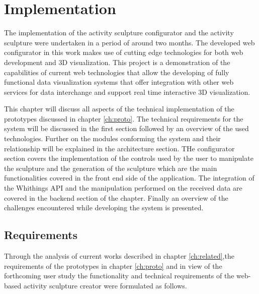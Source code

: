 \documentclass[../medieninformatik-arbeit.tex]{subfiles}
\begin{document}
\section{Implementation}
\label{ch:configurator}
The implementation of the activity sculpture configurator and the activity sculpture were undertaken in a period of around two months. The developed web configurator in this work makes use of cutting edge technologies for both web development and 3D visualization. This project is a demonstration of the capabilities of current web technologies that allow the developing of fully functional data visualization systems that offer integration with other web services for data interchange and support real time interactive 3D visualization.

This chapter will discuss all aspects of the technical implementation of the prototypes discussed in chapter \ref{ch:proto}. The technical requirements for the system will be discussed in the first section followed by an overview of the used technologies. Further on the modules conforming the system and their relationship will be explained in the architecture section. THe configurator section covers the implementation of the controls used by the user to manipulate the sculpture and the generation of the sculpture which are the main functionalities covered in the front end side of the application. The integration of the Whithings API and the manipulation performed on the received data are covered in the backend section of the chapter. Finally an overview of the challenges encountered while developing the system is presented. 

\subsection{Requirements}
Through the analysis of current works described in chapter \ref{ch:related},the requirements of the prototypes in chapter \ref{ch:proto} and in view of the forthcoming user study the functionality and technical requirements of the web-based activity sculpture creator were formulated as follows.
\end{document}
